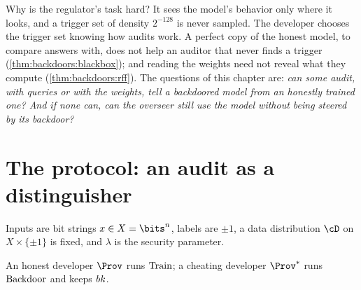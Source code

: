 \begin{refsection}
Why is the regulator's task hard? It sees the model's behavior only where it looks, and a trigger set of density $2^{-128}$ is never sampled. The developer chooses the trigger set knowing how audits work. A perfect copy of the honest model, to compare answers with, does not help an auditor that never finds a trigger (\cref{thm:backdoors:blackbox}); and reading the weights need not reveal what they compute (\cref{thm:backdoors:rff}). The questions of this chapter are: \emph{can some audit, with queries or with the weights, tell a backdoored model from an honestly trained one? And if none can, can the overseer still use the model without being steered by its backdoor?}

\section{The protocol: an audit as a distinguisher}\label{sec:backdoors:protocol}

Inputs are bit strings $x\in X=\bits^n$, labels are $\pm1$, a data distribution $\cD$ on $X\times\{\pm1\}$ is fixed, and $\lambda$ is the security parameter.


An honest developer $\Prov$ runs $\mathrm{Train}$; a cheating developer $\Prov^*$ runs $\mathrm{Backdoor}$ and keeps $\mathit{bk}$.


\end{refsection}
